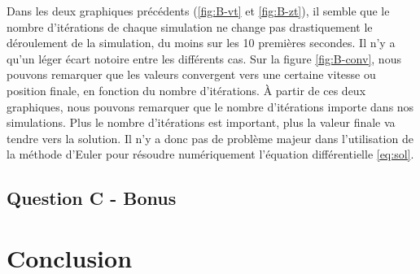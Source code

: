\documentclass[a4paper,12pt,twoside]{article}
\begin{document}
Dans les deux graphiques précédents (\ref{fig:B-vt} et \ref{fig:B-zt}), il semble que le nombre d'itérations de chaque simulation ne change pas drastiquement le déroulement de la simulation, du moins sur les 10 premières secondes. Il n'y a qu'un léger écart notoire entre les différents cas. Sur la figure \ref{fig:B-conv}, nous pouvons remarquer que les valeurs convergent vers une certaine vitesse ou position finale, en fonction du nombre d'itérations. À partir de ces deux graphiques, nous pouvons remarquer que le nombre d'itérations importe dans nos simulations. Plus le nombre d'itérations est important, plus la valeur finale va tendre vers la solution. Il n'y a donc pas de problème majeur dans l'utilisation de la méthode d'Euler pour résoudre numériquement l'équation différentielle \ref{eq:sol}.

\subsection{Question C - Bonus}

\section{Conclusion}
\end{document}
